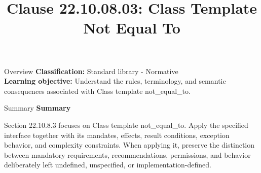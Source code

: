 \documentclass[10pt,letterpaper]{article}
\title{Clause 22.10.08.03: Class Template Not Equal To}
\author{}
\date{}
\begin{document}
\maketitle
\begin{CornellOverviewBox}{Overview}
\textbf{Classification:} Standard library - Normative\\[2pt]
\textbf{Learning objective:} Understand the rules, terminology, and semantic consequences associated with Class template not\_equal\_to.
\end{CornellOverviewBox}\begin{CornellSummaryBox}{Summary}
{\sffamily\bfseries\color{Accent} Summary}\par\vspace{3pt}Section 22.10.8.3 focuses on Class template not\_equal\_to. Apply the specified interface together with its mandates, effects, result conditions, exception behavior, and complexity constraints. When applying it, preserve the distinction between mandatory requirements, recommendations, permissions, and behavior deliberately left undefined, unspecified, or implementation-defined.
\end{CornellSummaryBox}
\end{document}
